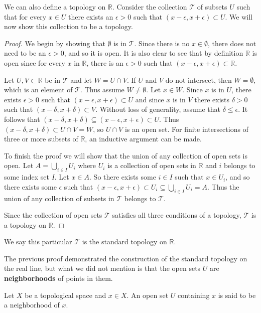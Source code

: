 \documentclass[12pt,oneside]{amsbook}
\newenvironment{defn}[1][Definition.]{\begin{trivlist}
\item[\hskip \labelsep {\bfseries #1}]}{\end{trivlist}}
\newcommand{\R}{\mathbb{R}}
\newcommand{\T}{\mathcal{T}}
\begin{document}
We can also define a topology on $\R$. Consider the collection $\mathcal{T}$ of subsets $U$ such that for every $x \in U$ there exists an $\epsilon >0$ such that $(x-\epsilon, x+\epsilon)\subset U$. We will now show this collection to be a topology.


\begin{proof}
We begin by showing that $\emptyset$ is in $\mathcal{T}$. Since there is no $x \in \emptyset$, there does not need to be an $\epsilon >0$, and so it is open. It is also clear to see that by definition $\R$ is open since for every $x$ in $\R$, there is an $\epsilon >0$ such that $(x-\epsilon, x+\epsilon) \subset \R$.

Let $U,V \subset \R$ be in $\T$ and let $W = U \cap V$. If $U$ and $V$ do not intersect, then $W=\emptyset$, which is an element of $\mathcal{T}$. Thus assume $W\neq \emptyset$. Let $x \in W$. Since $x$ is in $U$, there exists $\epsilon>0$ such that $(x-\epsilon, x+\epsilon)\subset U$ and since $x$ is in $V$ there exists $\delta>0$ such that $(x-\delta, x+\delta)\subset V$. Without loss of generality, assume that $\delta \leq \epsilon$. It follows that $(x-\delta, x+\delta) \subseteq (x-\epsilon, x+\epsilon) \subset U$. Thus $(x-\delta, x+\delta)\subset U \cap V = W$, so $U\cap V$ is an open set. For finite intersections of three or more subsets of $\R$, an inductive argument can be made.

To finish the proof we will show that the union of any collection of open sets is open. Let $A=\bigcup_{i\in I} U_i$ where ${U_i}$ is a collection of open sets in $\R$ and $i$ belongs to some index set $I$. Let $x \in A$. So there exists some $i\in I$ such that $x\in U_i$, and so there exists some $\epsilon $ such that $(x-\epsilon,x+\epsilon)\subset U_i \subseteq  \bigcup_{i\in I} U_i = A$. Thus the union of any collection of subsets in $\mathcal{T}$ belongs to $\mathcal{T}$.

Since the collection of open sets $\T$ satisfies all three conditions of a topology, $\T$ is a topology on $\R$. 
\end{proof}

We say this particular $\T$ is the standard topology on $\R$. 

The previous proof demonstrated the construction of the standard topology on the real line, but what we did not mention is that the open sets $U$ are \textbf{neighborhoods} of points in them.  

\begin{defn}
Let $X$ be a topological space and $x\in X$. An open set $U$ containing $x$ is said to be a neighborhood of $x$.
\end{defn}
\end{document}
